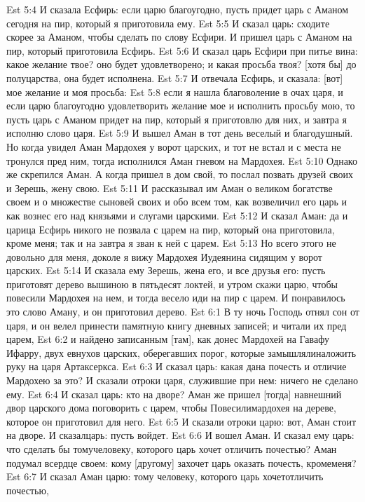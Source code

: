 Est 5:4  И сказала Есфирь: если царю благоугодно, пусть придет царь с Аманом сегодня на пир, который я приготовила ему.
Est 5:5  И сказал царь: сходите скорее за Аманом, чтобы сделать по слову Есфири. И пришел царь с Аманом на пир, который приготовила Есфирь.
Est 5:6  И сказал царь Есфири при питье вина: какое желание твое? оно будет удовлетворено; и какая просьба твоя? [хотя бы] до полуцарства, она будет исполнена.
Est 5:7  И отвечала Есфирь, и сказала: [вот] мое желание и моя просьба:
Est 5:8  если я нашла благоволение в очах царя, и если царю благоугодно удовлетворить желание мое и исполнить просьбу мою, то пусть царь с Аманом придет на пир, который я приготовлю для них, и завтра я исполню слово царя.
Est 5:9  И вышел Аман в тот день веселый и благодушный. Но когда увидел Аман Мардохея у ворот царских, и тот не встал и с места не тронулся пред ним, тогда исполнился Аман гневом на Мардохея.
Est 5:10  Однако же скрепился Аман. А когда пришел в дом свой, то послал позвать друзей своих и Зерешь, жену свою.
Est 5:11  И рассказывал им Аман о великом богатстве своем и о множестве сыновей своих и обо всем том, как возвеличил его царь и как вознес его над князьями и слугами царскими.
Est 5:12  И сказал Аман: да и царица Есфирь никого не позвала с царем на пир, который она приготовила, кроме меня; так и на завтра я зван к ней с царем.
Est 5:13  Но всего этого не довольно для меня, доколе я вижу Мардохея Иудеянина сидящим у ворот царских.
Est 5:14  И сказала ему Зерешь, жена его, и все друзья его: пусть приготовят дерево вышиною в пятьдесят локтей, и утром скажи царю, чтобы повесили Мардохея на нем, и тогда весело иди на пир с царем. И понравилось это слово Аману, и он приготовил дерево.
Est 6:1  В ту ночь Господь отнял сон от царя, и он велел принести памятную книгу дневных записей; и читали их пред царем,
Est 6:2  и найдено записанным [там], как донес Мардохей на Гавафу Ифарру, двух евнухов царских, оберегавших порог, которые замышлялиналожить руку на царя Артаксеркса.
Est 6:3  И сказал царь: какая дана почесть и отличие Мардохею за это? И сказали отроки царя, служившие при нем: ничего не сделано ему.
Est 6:4  И сказал царь: кто на дворе? Аман же пришел [тогда] навнешний двор царского дома поговорить с царем, чтобы Повесилимардохея на дереве, которое он приготовил для него.
Est 6:5  И сказали отроки царю: вот, Аман стоит на дворе. И сказалцарь: пусть войдет.
Est 6:6  И вошел Аман. И сказал ему царь: что сделать бы томучеловеку, которого царь хочет отличить почестью? Аман подумал всердце своем: кому [другому] захочет царь оказать почесть, кромеменя?
Est 6:7  И сказал Аман царю: тому человеку, которого царь хочетотличить почестью,
